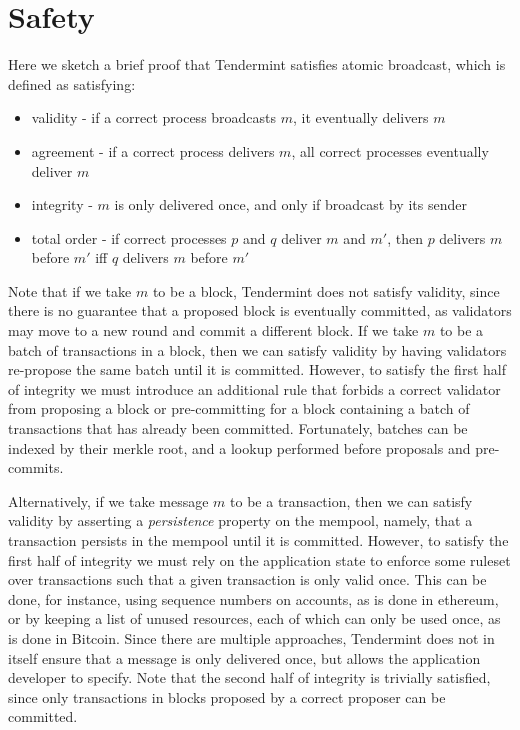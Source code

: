 \section{Safety}

Here we sketch a brief proof that Tendermint satisfies atomic broadcast,
which is defined as satisfying:

\begin{itemize}
\item validity - if a correct process broadcasts $m$, it eventually delivers $m$
\item agreement - if a correct process delivers $m$, all correct processes eventually deliver $m$
\item integrity - $m$ is only delivered once, and only if broadcast by its sender
\item total order - if correct processes $p$ and $q$ deliver $m$ and $m'$, then $p$ delivers $m$ before $m'$ iff $q$ delivers $m$ before $m'$
\end{itemize}

Note that if we take $m$ to be a block,
Tendermint does not satisfy validity,
since there is no guarantee that a proposed block is eventually committed, 
as validators may move to a new round and commit a different block.
If we take $m$ to be a batch of transactions in a block, 
then we can satisfy validity by having validators re-propose the same batch until it is committed.
However, to satisfy the first half of integrity 
we must introduce an additional rule that forbids a correct validator from 
proposing a block or pre-committing for a block containing a 
batch of transactions that has already been committed.
Fortunately, batches can be indexed by their merkle root,
and a lookup performed before proposals and pre-commits.

Alternatively, if we take message $m$ to be a transaction, 
then we can satisfy validity by asserting a \emph{persistence}
property on the mempool, namely, that a transaction persists in the mempool 
until it is committed.
However, to satisfy the first half of integrity we must 
rely on the application state to enforce some ruleset over 
transactions such that a given transaction is only valid once. 
This can be done, for instance, using sequence numbers on accounts,
as is done in ethereum, 
or by keeping a list of unused resources, each of which can only be used once,
as is done in Bitcoin.
Since there are multiple approaches,
Tendermint does not in itself ensure that a message is only delivered once,
but allows the application developer to specify.
Note that the second half of integrity is trivially satisfied,
since only transactions in blocks proposed by a correct proposer can be committed.

